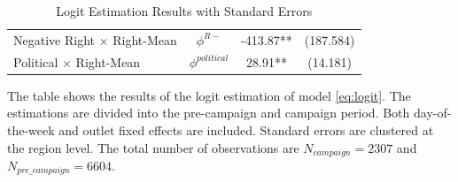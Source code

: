 \documentclass[12pt]{article}
\begin{document}
\begin{table}[!htb]
\begin{threeparttable}
\begin{tabular}{lccc}
				Negative Right $\times$ Right-Mean & $\phi^{R-}$ & -413.87** & (187.584) \\
				Political $\times$ Right-Mean & $\phi^{political}$ & 28.91** & (14.181) \\
				\hline
			\end{tabular}
			\caption{Logit Estimation Results with Standard Errors}
				\begin{tablenotes}
				\small
				\item \footnotesize{The table shows the results of the logit estimation of model \ref{eq:logit}. The estimations are divided into the pre-campaign and campaign period. Both day-of-the-week and outlet fixed effects are included. Standard errors are clustered at the region level. The total number of observations are $N_{campaign}=2307$ and  $N_{pre\_campaign}=6604$.}
			\end{tablenotes}
		\end{threeparttable}
	\end{table}
	
	
	
\end{document}
